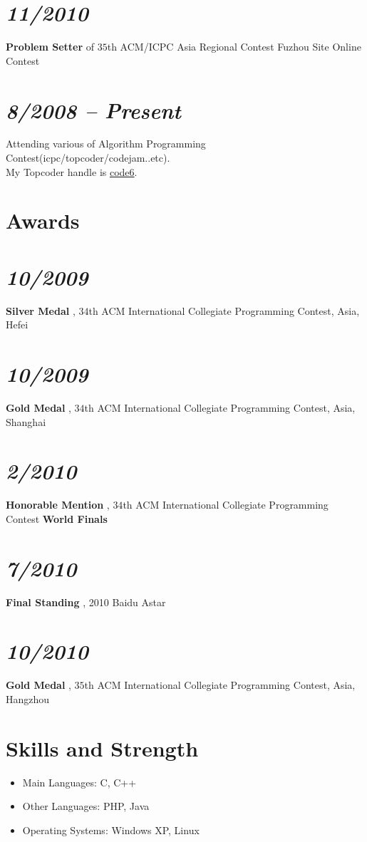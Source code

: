 \documentclass[margin,line]{res}
\newcommand{\ressection}[1]{
    {\colorbox{bg}{\fontfamily{phv}\selectfont\large#1}}
}
\begin{document}
\begin{resume}
\section{\em 11/2010} \textbf{Problem Setter} of $35$th ACM/ICPC Asia Regional Contest Fuzhou Site Online Contest\vspace{-5mm}
\section{\em 8/2008 -- Present} Attending various of Algorithm Programming Contest(icpc/topcoder/codejam..etc).\\
 My Topcoder handle is \href{http://www.topcoder.com/tc?module=MemberProfile&cr=22758532}{code6}.

\section{\ressection{Awards}}
\vspace{5mm}
\section{\em 10/2009} \textbf{Silver Medal} , $34$th ACM International
Collegiate Programming Contest, Asia, Hefei\vspace{-5mm}

\section{\em 10/2009} \textbf{Gold Medal} , $34$th ACM International
Collegiate Programming Contest, Asia, Shanghai\vspace{-5mm}

\section{\em 2/2010} \textbf{Honorable Mention} , $34$th ACM International
Collegiate Programming Contest \textbf{World Finals}\vspace{-5mm}

\section{\em 7/2010} \textbf{Final Standing} , 2010 Baidu Astar\vspace{-5mm}

\section{\em 10/2010} \textbf{Gold Medal} , $35$th ACM International
Collegiate Programming Contest, Asia, Hangzhou

\section{\ressection{Skills and Strength}}
\vspace{1cm}
\begin{itemize}
            \item[\ding {72}] Main Languages: C, C++
            \item[\ding {72}] Other Languages: PHP, Java
            \item[\ding {72}] Operating Systems: Windows XP, Linux
\end{itemize}

\end{resume}
\end{document}
